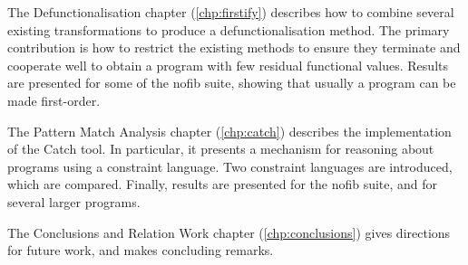 The Defunctionalisation chapter (\ref{chp:firstify}) describes how to combine several existing transformations to produce a defunctionalisation method. The primary contribution is how to restrict the existing methods to ensure they terminate and cooperate well to obtain a program with few residual functional values. Results are presented for some of the nofib suite, showing that usually a program can be made first-order.

The Pattern Match Analysis chapter (\ref{chp:catch}) describes the implementation of the Catch tool. In particular, it presents a mechanism for reasoning about programs using a constraint language. Two constraint languages are introduced, which are compared. Finally, results are presented for the nofib suite, and for several larger programs.

The Conclusions and Relation Work chapter (\ref{chp:conclusions}) gives directions for future work, and makes concluding remarks.

